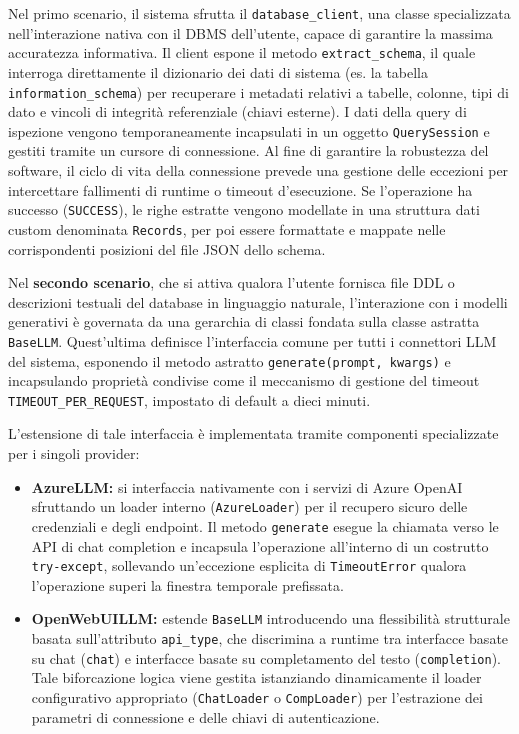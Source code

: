 Nel primo scenario, il sistema sfrutta il \texttt{database\_client}, una
classe specializzata nell'interazione nativa con il DBMS dell'utente,
capace di garantire la massima accuratezza informativa. Il client espone
il metodo \texttt{extract\_schema}, il quale interroga direttamente il
dizionario dei dati di sistema (es. la tabella
\texttt{information\_schema}) per recuperare i metadati relativi a
tabelle, colonne, tipi di dato e vincoli di integrità referenziale
(chiavi esterne). I dati della query di ispezione vengono
temporaneamente incapsulati in un oggetto \texttt{QuerySession} e
gestiti tramite un cursore di connessione. Al fine di garantire la
robustezza del software, il ciclo di vita della connessione prevede una
gestione delle eccezioni per intercettare fallimenti di runtime o
timeout d'esecuzione. Se l'operazione ha successo (\texttt{SUCCESS}), le
righe estratte vengono modellate in una struttura dati custom denominata
\texttt{Records}, per poi essere formattate e mappate nelle
corrispondenti posizioni del file JSON dello schema.

Nel \textbf{secondo scenario}, che si attiva qualora l'utente fornisca
file DDL o descrizioni testuali del database in linguaggio naturale,
l'interazione con i modelli generativi è governata da una gerarchia di
classi fondata sulla classe astratta \texttt{BaseLLM}. Quest'ultima
definisce l'interfaccia comune per tutti i connettori LLM del sistema,
esponendo il metodo astratto \texttt{generate(prompt,\ kwargs)} e
incapsulando proprietà condivise come il meccanismo di gestione del
timeout \texttt{TIMEOUT\_PER\_REQUEST}, impostato di default a dieci
minuti.

L'estensione di tale interfaccia è implementata tramite componenti
specializzate per i singoli provider:

\begin{itemize}
\item
  \textbf{AzureLLM:} si interfaccia nativamente con i servizi di Azure
  OpenAI sfruttando un loader interno (\texttt{AzureLoader}) per il
  recupero sicuro delle credenziali e degli endpoint. Il metodo
  \texttt{generate} esegue la chiamata verso le API di chat
  completion e incapsula l'operazione all'interno di un costrutto
  \texttt{try-except}, sollevando un'eccezione esplicita di
  \texttt{TimeoutError} qualora l'operazione superi la finestra
  temporale prefissata.
\item
  \textbf{OpenWebUILLM:} estende \texttt{BaseLLM} introducendo una
  flessibilità strutturale basata sull'attributo \texttt{api\_type}, che
  discrimina a runtime tra interfacce basate su chat (\texttt{chat}) e
  interfacce basate su completamento del testo (\texttt{completion}).
  Tale biforcazione logica viene gestita istanziando dinamicamente il
  loader configurativo appropriato (\texttt{ChatLoader} o
  \texttt{CompLoader}) per l'estrazione dei parametri di connessione e
  delle chiavi di autenticazione.
\end{itemize}

